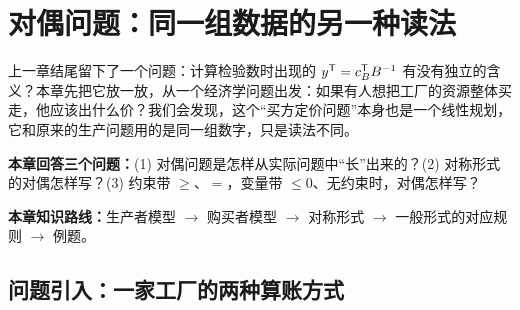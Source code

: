 \section{对偶问题：同一组数据的另一种读法}

上一章结尾留下了一个问题：计算检验数时出现的 $y^{\mathsf T}=c_B^{\mathsf T} B^{-1}$ 有没有独立的含义？本章先把它放一放，从一个经济学问题出发：如果有人想把工厂的资源整体买走，他应该出什么价？我们会发现，这个“买方定价问题”本身也是一个线性规划，它和原来的生产问题用的是同一组数字，只是读法不同。

\noindent\textbf{本章回答三个问题：}(1) 对偶问题是怎样从实际问题中“长”出来的？(2) 对称形式的对偶怎样写？(3) 约束带 $\ge$、$=$，变量带 $\le0$、无约束时，对偶怎样写？\par
\noindent\textbf{本章知识路线：}生产者模型 $\to$ 购买者模型 $\to$ 对称形式 $\to$ 一般形式的对应规则 $\to$ 例题。

\subsection{问题引入：一家工厂的两种算账方式}

